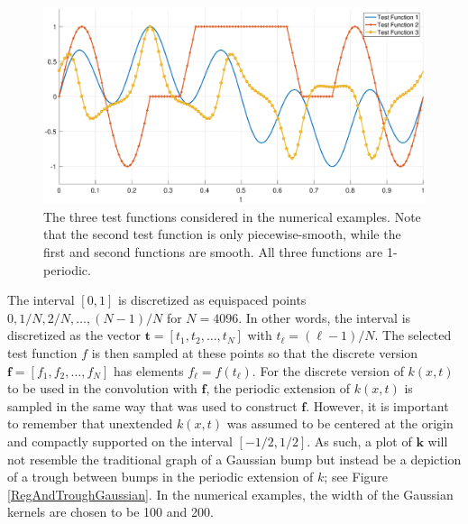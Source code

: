 \documentclass[12pt]{article}
\newcommand{\kVec}{\mathbf{k}}	%
\newcommand{\fVec}{\mathbf{f}}	%
\newcommand{\tVec}{\mathbf{t}}	%
\begin{document}
\begin{figure}
	\centerline{\includegraphics[scale = 0.45]{Figures/TestFunctions1D.eps}}
\caption{The three test functions considered in the numerical examples. Note that the second test function is only piecewise-smooth, while the first and second functions are smooth. All three functions are 1-periodic.}
\label{TestFunctions}
\end{figure}

The interval $[0,1]$ is discretized as equispaced points $0, 1/N, 2/N, \ldots, (N-1)/N$ for $N = 4096$. In other words, the interval is discretized as the vector $\tVec = [t_1,t_2,\ldots,t_N]$ with $t_\ell = (\ell-1)/N$. The selected test function $f$ is then sampled at these points so that the discrete version $\fVec = [f_1,f_2,\ldots,f_N]$ has elements $f_\ell = f(t_\ell)$. For the discrete version of $k(x,t)$ to be used in the convolution with $\fVec$, the periodic extension of $k(x,t)$ is sampled in the same way that was used to construct $\fVec$. However, it is important to remember that unextended $k(x,t)$ was assumed to be centered at the origin and compactly supported on the interval $[-1/2,1/2]$. As such, a plot of $\kVec$ will not resemble the traditional graph of a Gaussian bump but instead be a depiction of a trough between bumps in the periodic extension of $k$; see Figure \ref{RegAndTroughGaussian}. In the numerical examples, the width of the Gaussian kernels are chosen to be 100 and 200.  \par
\end{document}
